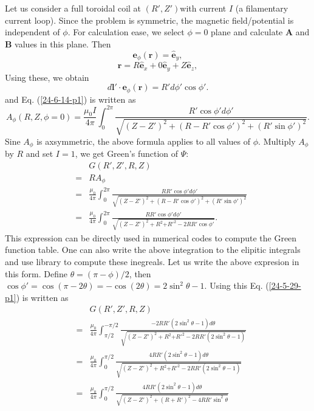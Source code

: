 \documentclass{llncs}
\begin{document}
Let us consider a full toroidal coil at $(R', Z') $with current $I$ (a
filamentary current loop). Since the problem is symmetric, the magnetic
field/potential is independent of $\phi$. For calculation ease, we select
$\phi = 0$ plane and calculate $\mathbf{A}$ and $\mathbf{B}$ values in this
plane. Then
\begin{equation}
  \mathbf{e}_{\phi} (\mathbf{r}) = \hat{\mathbf{e}}_y,
\end{equation}
\begin{equation}
  \mathbf{r}= R \hat{\mathbf{e}}_x + 0 \hat{\mathbf{e}}_y + Z
  \hat{\mathbf{e}}_z,
\end{equation}
Using these, we obtain
\begin{equation}
  d\mathbf{l}' \cdot \mathbf{e}_{\phi} (\mathbf{r}) = R' d \phi' \cos \phi' .
\end{equation}
and Eq. (\ref{24-6-14-p1}) is written as
\begin{equation}
  A_{\phi} (R, Z, \phi = 0) = \frac{\mu_0 I}{4 \pi} \int_0^{2 \pi} \frac{R'
  \cos \phi' d \phi'}{\sqrt{(Z - Z')^2 + (R - R' \cos \phi')^2 + (R' \sin
  \phi')^2}} .
\end{equation}
Sine $A_{\phi}$ is axsymmetric, the above formula applies to all values of
$\phi$. Multiply $A_{\phi}$ by $R$ and set $I = 1$, we get Green's function of
$\Psi$:
\begin{eqnarray}
  &  & G (R', Z', R, Z) \nonumber\\
  & = & R A_{\phi} \nonumber\\
  & = & \frac{\mu_0}{4 \pi} \int_0^{2 \pi} \frac{R R' \cos \phi' d
  \phi'}{\sqrt{(Z - Z')^2 + (R - R' \cos \phi')^2 + (R' \sin \phi')^2}}
  \nonumber\\
  & = & \frac{\mu_0}{4 \pi} \int_0^{2 \pi} \frac{R R' \cos \phi' d
  \phi'}{\sqrt{(Z - Z')^2 + R^2 {+ R'}^2 - 2 R R' \cos \phi'}} . 
  \label{24-5-29-p1}
\end{eqnarray}
This expression can be directly used in numerical codes to compute the Green
function table. One can also write the above integration to the elipitic
integrals and use library to compute these inegreals. Let us write the above
expresion in this form. Define $\theta = (\pi - \phi) / 2$, then $\cos \phi' =
\cos (\pi - 2 \theta) = - \cos (2 \theta) = 2 \sin^2 \theta - 1$. Using this
Eq. (\ref{24-5-29-p1}) is written as
\begin{eqnarray}
  &  & G (R', Z', R, Z) \nonumber\\
  & = & \frac{\mu_0}{4 \pi} \int_{\pi / 2}^{- \pi / 2} \frac{- 2 R R' (2
  \sin^2 \theta - 1) d \theta}{\sqrt{(Z - Z')^2 + R^2 {+ R'}^2 - 2 R R' (2
  \sin^2 \theta - 1)}} \nonumber\\
  & = & \frac{\mu_0}{4 \pi} \int_0^{\pi / 2} \frac{4 R R' (2 \sin^2 \theta -
  1) d \theta}{\sqrt{(Z - Z')^2 + R^2 {+ R'}^2 - 2 R R' (2 \sin^2 \theta -
  1)}} \nonumber\\
  & = & \frac{\mu_0}{4 \pi} \int_0^{\pi / 2} \frac{4 R R' (2 \sin^2 \theta -
  1) d \theta}{\sqrt{(Z - Z')^2 + (R + R')^2 - 4 R R' \sin^2 \theta}} 
\end{eqnarray}
\end{document}
